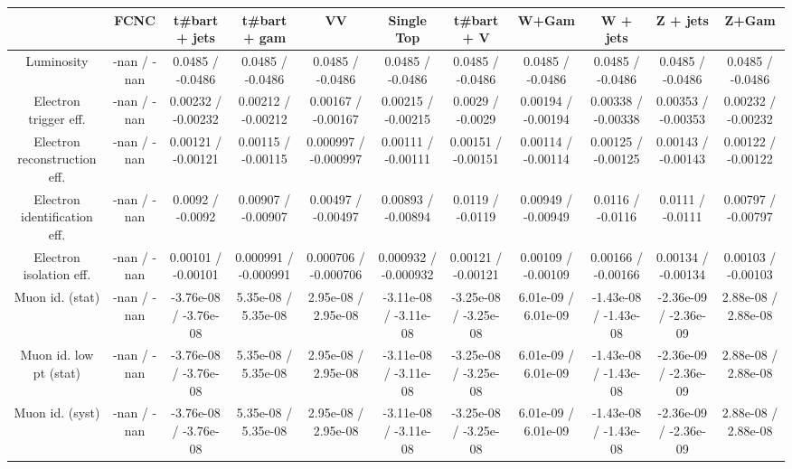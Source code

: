 \begin{table}[htbp]
\begin{center}
\footnotesize
\begin{tabular}{|c|c|c|c|c|c|c|c|c|c|c|}
\hline 
      & FCNC      & t#bar{t} + jets      & t#bar{t} +  gam      & VV      & Single Top      & t#bar{t} + V      & W+Gam      & W + jets      & Z + jets      & Z+Gam \\ 
\hline 
  Luminosity & -nan / -nan & 0.0485 / -0.0486 & 0.0485 / -0.0486 & 0.0485 / -0.0486 & 0.0485 / -0.0486 & 0.0485 / -0.0486 & 0.0485 / -0.0486 & 0.0485 / -0.0486 & 0.0485 / -0.0486 & 0.0485 / -0.0486 \\ 
  Electron trigger eff. & -nan / -nan & 0.00232 / -0.00232 & 0.00212 / -0.00212 & 0.00167 / -0.00167 & 0.00215 / -0.00215 & 0.0029 / -0.0029 & 0.00194 / -0.00194 & 0.00338 / -0.00338 & 0.00353 / -0.00353 & 0.00232 / -0.00232 \\ 
  Electron reconstruction eff. & -nan / -nan & 0.00121 / -0.00121 & 0.00115 / -0.00115 & 0.000997 / -0.000997 & 0.00111 / -0.00111 & 0.00151 / -0.00151 & 0.00114 / -0.00114 & 0.00125 / -0.00125 & 0.00143 / -0.00143 & 0.00122 / -0.00122 \\ 
  Electron identification eff. & -nan / -nan & 0.0092 / -0.0092 & 0.00907 / -0.00907 & 0.00497 / -0.00497 & 0.00893 / -0.00894 & 0.0119 / -0.0119 & 0.00949 / -0.00949 & 0.0116 / -0.0116 & 0.0111 / -0.0111 & 0.00797 / -0.00797 \\ 
  Electron isolation eff. & -nan / -nan & 0.00101 / -0.00101 & 0.000991 / -0.000991 & 0.000706 / -0.000706 & 0.000932 / -0.000932 & 0.00121 / -0.00121 & 0.00109 / -0.00109 & 0.00166 / -0.00166 & 0.00134 / -0.00134 & 0.00103 / -0.00103 \\ 
  Muon id. (stat) & -nan / -nan & -3.76e-08 / -3.76e-08 & 5.35e-08 / 5.35e-08 & 2.95e-08 / 2.95e-08 & -3.11e-08 / -3.11e-08 & -3.25e-08 / -3.25e-08 & 6.01e-09 / 6.01e-09 & -1.43e-08 / -1.43e-08 & -2.36e-09 / -2.36e-09 & 2.88e-08 / 2.88e-08 \\ 
  Muon id. low pt (stat) & -nan / -nan & -3.76e-08 / -3.76e-08 & 5.35e-08 / 5.35e-08 & 2.95e-08 / 2.95e-08 & -3.11e-08 / -3.11e-08 & -3.25e-08 / -3.25e-08 & 6.01e-09 / 6.01e-09 & -1.43e-08 / -1.43e-08 & -2.36e-09 / -2.36e-09 & 2.88e-08 / 2.88e-08 \\ 
  Muon id. (syst) & -nan / -nan & -3.76e-08 / -3.76e-08 & 5.35e-08 / 5.35e-08 & 2.95e-08 / 2.95e-08 & -3.11e-08 / -3.11e-08 & -3.25e-08 / -3.25e-08 & 6.01e-09 / 6.01e-09 & -1.43e-08 / -1.43e-08 & -2.36e-09 / -2.36e-09 & 2.88e-08 / 2.88e-08 \\ 

\end{tabular}
\end{center}
\end{table}
